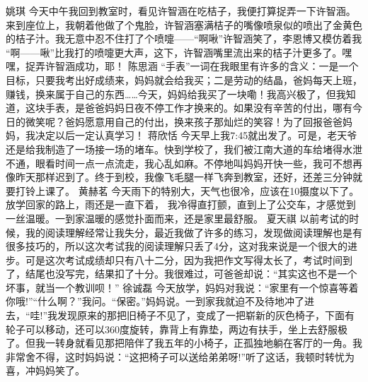 {}\markdownRendererInterblockSeparator
{}姚琪\markdownRendererInterblockSeparator
{}今天中午我回到教室时，看见许智涵在吃桔子，我便打算捉弄一下许智涵。来到座位上，我朝着他做了个鬼脸，许智涵塞满桔子的嘴像喷泉似的喷出了金黄色的桔子汁。我无意中忍不住打了个喷嚏——“啊啾”许智涵笑了，李恩博又模仿着我 “啊——啾”比我打的喷嚏更大声，这下，许智涵嘴里流出来的桔子汁更多了。嘿嘿，捉弄许智涵成功，耶！ \markdownRendererInterblockSeparator
{}\markdownRendererInterblockSeparator
{}陈思涵\markdownRendererInterblockSeparator
{}“手表”一词在我眼里有许多的含义：一是一个目标，只要我考出好成绩来，妈妈就会给我买；二是劳动的结晶，爸妈每天上班，赚钱，换来属于自己的东西……今天，妈妈给我买了一块嘞！我高兴极了，但我知道，这块手表，是爸爸妈妈日夜不停工作才换来的。如果没有辛苦的付出，哪有今日的微笑呢？爸妈愿意用自己的付出，换来孩子那灿烂的笑容！为了回报爸爸妈妈，我决定以后一定认真学习！\markdownRendererInterblockSeparator
{}\markdownRendererInterblockSeparator
{}蒋欣恬\markdownRendererInterblockSeparator
{}今天早上我7:45就出发了。可是，老天爷还是给我制造了一场接一场的堵车。快到学校了，我们被江南大道的车给堵得水泄不通，眼看时间一点一点流走，我心乱如麻。不停地叫妈妈开快一些，我可不想再像昨天那样迟到了。终于到校，我像飞毛腿一样飞奔到教室，还好，还差三分钟就要打铃上课了。\markdownRendererInterblockSeparator
{}\markdownRendererInterblockSeparator
{}黄赫茗\markdownRendererInterblockSeparator
{}今天雨下的特别大，天气也很冷，应该在10摄度以下了。放学回家的路上，雨还是一直下着， 我冷得直打颤，直到上了公交车，才感觉到一丝温暖。一到家温暖的感觉扑面而来，还是家里最舒服。 \markdownRendererInterblockSeparator
{}\markdownRendererInterblockSeparator
{}夏天祺\markdownRendererInterblockSeparator
{}以前考试的时候，我的阅读理解经常让我失分，最近我做了许多的练习，发现做阅读理解也是有很多技巧的，所以这次考试我的阅读理解只丢了4分，这对我来说是一个很大的进步。可是这次考试成绩却只有八十二分，因为我把作文写得太长了，考试时间到了，结尾也没写完，结果扣了十分。我很难过，可爸爸却说：“其实这也不是一个坏事，就当一个教训呗！”\markdownRendererInterblockSeparator
{}\markdownRendererInterblockSeparator
{}徐诚磊\markdownRendererInterblockSeparator
{}今天放学，妈妈对我说：“家里有一个惊喜等着你哦!”“什么啊？”我问。“保密。”妈妈说。一到家我就迫不及待地冲了进去，“哇!”我发现原来的那把旧椅子不见了，变成了一把崭新的灰色椅子，下面有轮子可以移动，还可以360度旋转，靠背上有靠垫，两边有扶手，坐上去舒服极了。但我一转身就看见那把陪伴了我五年的小椅子，正孤独地躺在客厅的一角。我非常舍不得，这时妈妈说：“这把椅子可以送给弟弟呀!”听了这话，我顿时转忧为喜，冲妈妈笑了。\markdownRendererInterblockSeparator
